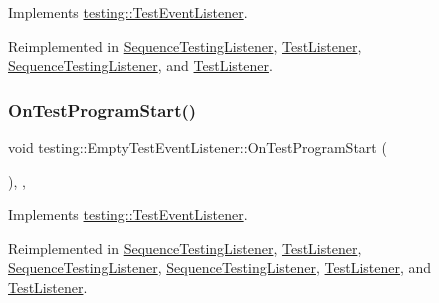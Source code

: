 Implements \mbox{\hyperlink{classtesting_1_1_test_event_listener_a5f6c84f39851e8a603a2d2e10063816b}{testing\+::\+Test\+Event\+Listener}}.



Reimplemented in \mbox{\hyperlink{class_sequence_testing_listener_a25b96acdbaa6f582e583e6b56bd39b42}{Sequence\+Testing\+Listener}}, \mbox{\hyperlink{class_test_listener_a6218f522f5b6b37050ff0ea630ac5fd3}{Test\+Listener}}, \mbox{\hyperlink{class_sequence_testing_listener_a2dcf940322a480b210d8e5e934dd0a79}{Sequence\+Testing\+Listener}}, and \mbox{\hyperlink{class_test_listener_ab1edf894efc1104f7ce35563bc24de23}{Test\+Listener}}.

\mbox{\label{classtesting_1_1_empty_test_event_listener_ac3f5033fcd82080edb45f546ce9854fe}} 
\subsubsection{\texorpdfstring{OnTestProgramStart()}{OnTestProgramStart()}\hspace{0.1cm}{\footnotesize\ttfamily [3/3]}}
{\footnotesize\ttfamily void testing\+::\+Empty\+Test\+Event\+Listener\+::\+On\+Test\+Program\+Start (\begin{DoxyParamCaption}\item[{const \mbox{\hyperlink{classtesting_1_1_unit_test}{Unit\+Test}} \&}]{ }\end{DoxyParamCaption})\hspace{0.3cm}{\ttfamily [inline]}, {\ttfamily [override]}, {\ttfamily [virtual]}}



Implements \mbox{\hyperlink{classtesting_1_1_test_event_listener_a5f6c84f39851e8a603a2d2e10063816b}{testing\+::\+Test\+Event\+Listener}}.



Reimplemented in \mbox{\hyperlink{class_sequence_testing_listener_a25b96acdbaa6f582e583e6b56bd39b42}{Sequence\+Testing\+Listener}}, \mbox{\hyperlink{class_test_listener_a6218f522f5b6b37050ff0ea630ac5fd3}{Test\+Listener}}, \mbox{\hyperlink{class_sequence_testing_listener_a2dcf940322a480b210d8e5e934dd0a79}{Sequence\+Testing\+Listener}}, \mbox{\hyperlink{class_sequence_testing_listener_a2dcf940322a480b210d8e5e934dd0a79}{Sequence\+Testing\+Listener}}, \mbox{\hyperlink{class_test_listener_ab1edf894efc1104f7ce35563bc24de23}{Test\+Listener}}, and \mbox{\hyperlink{class_test_listener_ab1edf894efc1104f7ce35563bc24de23}{Test\+Listener}}.

